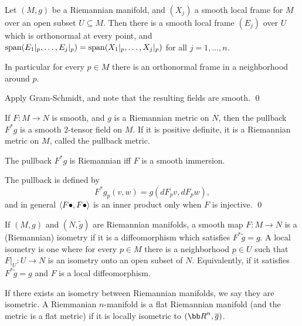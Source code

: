 \bprop

    Let $(M,g)$ be a Riemannian manifold, and $(X_j)$ a smooth local frame for $M$ over an open subset $U\subseteq M$.
    Then there is a smooth local frame $(E_j)$ over $U$ which is orthonormal at every point, and ${\rm span}(E_1|_p,\dots,E_j|_p)={\rm span}(X_1|_p,\dots,X_j|_p)$
    for all $j=1,\dots,n$.

    In particular for every $p\in M$ there is an orthonormal frame in a neighborhood around $p$.

\eprop

\bproof

    Apply Gram-Schmidt, and note that the resulting fields are smooth.
    \qed

\eproof

\bdefn

    If $F\colon M\to N$ is smooth, and $g$ is a Riemannian metric on $N$, then the pullback $F^*g$ is a smooth $2$-tensor field on $M$.
    If it is positive definite, it is a Riemannian metric on $M$, called the {\emphcolor pullback metric}.

\edefn


\bprop

    The pullback $F^*g$ is Riemannian iff $F$ is a smooth immersion.

\eprop

\bproof

    The pullback is defined by
    $$ F^*g_p(v,w) = g(dF_pv,dF_pw) , $$
    and in general $\mathopen{}\mathclose{\left<F\bullet,F\bullet\right>}$ is an inner product only when $F$ is injective.
    \qed

\eproof

\bdefn

    If $(M,g)$ and $(N,\tilde g)$ are Riemannian manifolds, a smooth map $F\colon M\to N$ is a {\emphcolor (Riemannian) isometry} if it is a diffeomorphism
    which satisfies $F^*\tilde g=g$.
    A {\emphcolor local isometry} is one where for every $p\in M$ there is a neighborhood $p\in U$ such that $F|_U\colon U\to N$ is an isometry onto an open subset of $N$.
    Equivalently, if it satisfies $F^*\tilde g=g$ and $F$ is a local diffeomorphism.

    If there exists an isometry between Riemannian manifolds, we say they are {\emphcolor isometric}.
    A Riemmanian $n$-manifold is a {\emphcolor flat Riemannian manifold} (and the metric is a {\emphcolor flat metric}) if it is locally isometric to $(\bR^n,\bar g)$.

\edefn

\bprop

